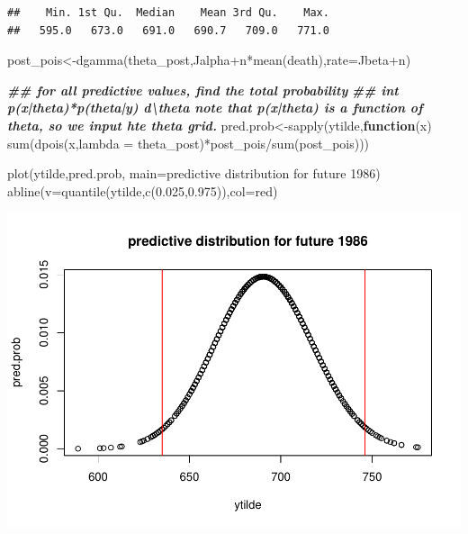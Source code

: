 \documentclass[
]{book}
\newenvironment{Shaded}{\begin{snugshade}}{\end{snugshade}}
\newcommand{\AttributeTok}[1]{\textcolor[rgb]{0.77,0.63,0.00}{#1}}
\newcommand{\ControlFlowTok}[1]{\textcolor[rgb]{0.13,0.29,0.53}{\textbf{#1}}}
\newcommand{\DocumentationTok}[1]{\textcolor[rgb]{0.56,0.35,0.01}{\textbf{\textit{#1}}}}
\newcommand{\FloatTok}[1]{\textcolor[rgb]{0.00,0.00,0.81}{#1}}
\newcommand{\FunctionTok}[1]{\textcolor[rgb]{0.00,0.00,0.00}{#1}}
\newcommand{\NormalTok}[1]{#1}
\newcommand{\OtherTok}[1]{\textcolor[rgb]{0.56,0.35,0.01}{#1}}
\newcommand{\SpecialCharTok}[1]{\textcolor[rgb]{0.00,0.00,0.00}{#1}}
\newcommand{\StringTok}[1]{\textcolor[rgb]{0.31,0.60,0.02}{#1}}
\theoremstyle{definition}
\theoremstyle{definition}
\theoremstyle{definition}
\theoremstyle{definition}
\theoremstyle{remark}
\begin{document}
\begin{verbatim}
##    Min. 1st Qu.  Median    Mean 3rd Qu.    Max. 
##   595.0   673.0   691.0   690.7   709.0   771.0
\end{verbatim}

\begin{Shaded}
\begin{Highlighting}[]
\NormalTok{   post\_pois}\OtherTok{\textless{}{-}}\FunctionTok{dgamma}\NormalTok{(theta\_post,Jalpha}\SpecialCharTok{+}\NormalTok{n}\SpecialCharTok{*}\FunctionTok{mean}\NormalTok{(death),}\AttributeTok{rate=}\NormalTok{Jbeta}\SpecialCharTok{+}\NormalTok{n)}

\DocumentationTok{\#\# for all predictive values,  find the total probability  }
   \DocumentationTok{\#\# int p(x|theta)*p(theta|y) d\textbackslash{}theta  note that p(x|theta) is a function of theta, so we input hte theta grid.}
\NormalTok{ pred.prob}\OtherTok{\textless{}{-}}\FunctionTok{sapply}\NormalTok{(ytilde,}\ControlFlowTok{function}\NormalTok{(x) }\FunctionTok{sum}\NormalTok{(}\FunctionTok{dpois}\NormalTok{(x,}\AttributeTok{lambda =}\NormalTok{ theta\_post)}\SpecialCharTok{*}\NormalTok{post\_pois}\SpecialCharTok{/}\FunctionTok{sum}\NormalTok{(post\_pois)))  }
  
 \FunctionTok{plot}\NormalTok{(ytilde,pred.prob, }\AttributeTok{main=}\StringTok{\textquotesingle{}predictive distribution for future 1986\textquotesingle{}}\NormalTok{)}
 \FunctionTok{abline}\NormalTok{(}\AttributeTok{v=}\FunctionTok{quantile}\NormalTok{(ytilde,}\FunctionTok{c}\NormalTok{(}\FloatTok{0.025}\NormalTok{,}\FloatTok{0.975}\NormalTok{)),}\AttributeTok{col=}\StringTok{\textquotesingle{}red\textquotesingle{}}\NormalTok{)}
\end{Highlighting}
\end{Shaded}

\includegraphics{_main_files/figure-latex/unnamed-chunk-26-2.pdf}
\end{document}
